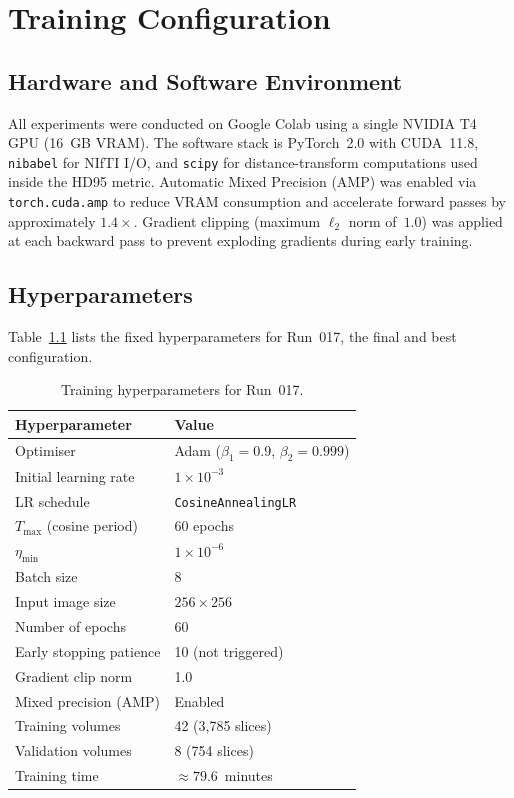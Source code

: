 \chapter{Training Configuration}
\label{chap:train}

\section{Hardware and Software Environment}

All experiments were conducted on Google Colab using a single NVIDIA T4 GPU (16~GB VRAM). The software stack is PyTorch~2.0 with CUDA~11.8, \texttt{nibabel} for NIfTI I/O, and \texttt{scipy} for distance-transform computations used inside the HD95 metric. Automatic Mixed Precision (AMP) was enabled via \texttt{torch.cuda.amp} to reduce VRAM consumption and accelerate forward passes by approximately $1.4\times$. Gradient clipping (maximum $\ell_2$ norm of~$1.0$) was applied at each backward pass to prevent exploding gradients during early training.

\section{Hyperparameters}

Table~\ref{tab:hyperparams} lists the fixed hyperparameters for Run~017, the final and best
configuration.

\begin{table}[h!]
\centering
\caption{Training hyperparameters for Run~017.}
\label{tab:hyperparams}
\begin{tabular}{ll}
\toprule
\textbf{Hyperparameter} & \textbf{Value} \\
\midrule
Optimiser               & Adam ($\beta_1 = 0.9$, $\beta_2 = 0.999$) \\
Initial learning rate   & $1 \times 10^{-3}$ \\
LR schedule             & \texttt{CosineAnnealingLR} \\
$T_{\max}$ (cosine period) & 60 epochs \\
$\eta_{\min}$           & $1 \times 10^{-6}$ \\
Batch size              & 8 \\
Input image size        & $256 \times 256$ \\
Number of epochs        & 60 \\
Early stopping patience & 10 (not triggered) \\
Gradient clip norm      & 1.0 \\
Mixed precision (AMP)   & Enabled \\
Training volumes        & 42 (3{,}785 slices) \\
Validation volumes      & 8 (754 slices) \\
Training time           & $\approx 79.6$~minutes \\
\bottomrule
\end{tabular}
\end{table}

